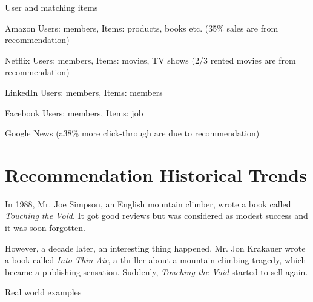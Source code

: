 \begin{bulletedlist}
\begin{bulletedlist}
		\end{bulletedlist}
		\item User and matching items
		\begin{bulletedlist}
			\item Amazon Users: members, Items: products, books etc. (35\% sales are from recommendation)
			\item Netflix Users: members, Items: movies, TV shows (2/3 rented movies are from recommendation)
			\item LinkedIn Users: members, Items: members
			\item Facebook Users: members, Items: job
			\item Google News (a38\% more click-through are due to recommendation)
		\end{bulletedlist}
	\end{bulletedlist}

	\section{Recommendation Historical Trends}
In 1988, Mr. Joe Simpson, an English mountain climber, wrote a book called \textit{Touching the Void}.  It got good reviews but was considered as modest success and it was soon forgotten.

However, a decade later, an interesting thing happened. Mr. Jon Krakauer wrote a book called \textit{Into Thin Air}, a thriller about a
mountain-climbing tragedy, which became a publishing sensation. Suddenly, \textit{Touching the Void} started to sell again.

Real world examples

